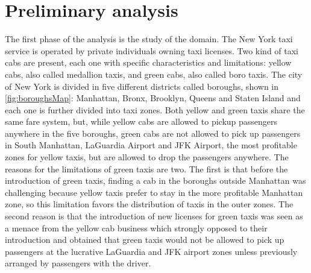 \documentclass{acm_proc_article-sp-sigmod09}
\begin{document}


\section{Preliminary analysis}
\label{sec:preliminaryAnalysis}
The first phase of the analysis is the study of the domain. The New York taxi service is operated by private individuals owning taxi licenses. Two kind of taxi cabs are present, each one with specific characteristics and limitations: yellow cabs, also called medallion taxis, and green cabs, also called boro taxis. The city of New York is divided in five different districts called boroughs, shown in \cref{fig:boroughsMap}: Manhattan, Bronx, Brooklyn, Queens and Staten Island and each one is further divided into taxi zones. Both yellow and green taxis share the same fare system, but, while yellow cabs are allowed to pickup passengers anywhere in the five boroughs, green cabs are not allowed to pick up passengers in South Manhattan, LaGuardia Airport and JFK Airport, the most profitable zones for yellow taxis, but are allowed to drop the passengers anywhere. The reasons for the limitations of green taxis are two. The first is that before the introduction of green taxis, finding a cab in the boroughs outside Manhattan was challenging because yellow taxis prefer to stay in the more profitable Manhattan zone, so this limitation favors the distribution of taxis in the outer zones. The second reason is that the introduction of new licenses for green taxis was seen as a menace from the yellow cab business which strongly opposed to their introduction and obtained that green taxis would not be allowed to pick up passengers at the lucrative LaGuardia and JFK airport zones unless previously arranged by passengers with the driver.
\end{document}
